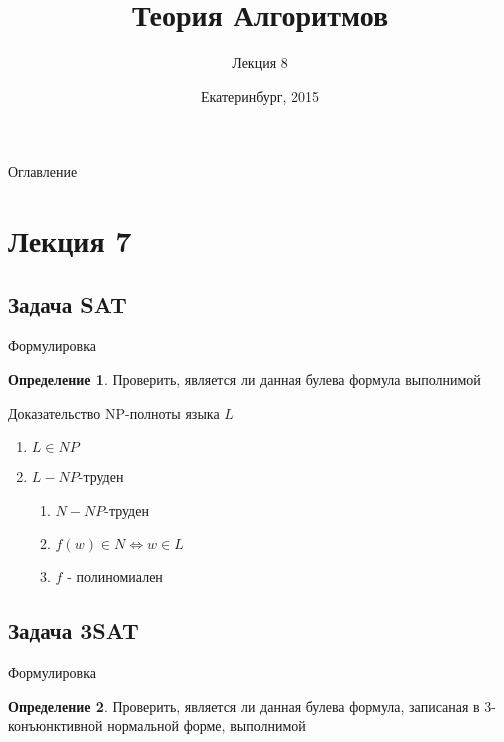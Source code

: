 \documentclass{beamer}
\title{Теория Алгоритмов}
\subtitle{Лекция 8}
\date{Екатеринбург, 2015}
\theoremstyle{definition}
\newtheorem{defn}{Определение}
\begin{document}
\begin{frame}
  \titlepage
\end{frame}

\begin{frame}{Оглавление}
  \tableofcontents
\end{frame}

\section{Лекция 7}
\subsection{Задача SAT}
\begin{frame}{Формулировка}
	\begin{defn}
		Проверить, является ли данная булева формула выполнимой
	\end{defn}
\end{frame}

\begin{frame}{Доказательство NP-полноты языка $L$}
	\begin{enumerate}
		\item $L \in NP$ 
		\item $L - NP$-труден
		\begin{enumerate}
			\item $N - NP$-труден
			\item $f(w) \in N \Leftrightarrow w \in L$
			\item $f$ - полиномиален
		\end{enumerate}
	\end{enumerate}
\end{frame}

\subsection{Задача 3SAT}
\begin{frame}{Формулировка}
	\begin{defn}
		Проверить, является ли данная булева формула, записаная в 3-конъюнктивной нормальной форме, выполнимой
	\end{defn}
\end{frame}
\end{document}
